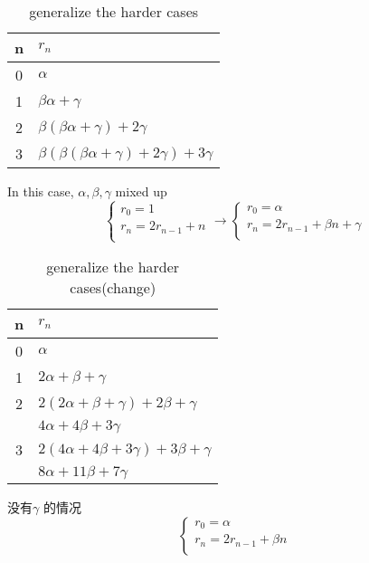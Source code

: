 \begin{table}[htbp]
	\centering
	\small
	\caption{generalize the harder cases}
	\begin{tabular}{cl}
		\toprule
		n & $ r_n $ \\
		\midrule
        0 & $ \alpha $  \\
        1 & $ \beta\alpha+\gamma $  \\
        2 & $ \beta(\beta\alpha+\gamma)+2\gamma $  \\
        3 & $ \beta(\beta(\beta\alpha+\gamma)+2\gamma)+3\gamma $  \\
		\bottomrule
	\end{tabular}%
	\label{tab:casesofharderChange003}%
\end{table}%
In this case, $ \alpha, \beta, \gamma $ mixed up
\begin{equation*}
    \left\{
        \begin{array}{l}
            r_0 = 1\\
            r_n = 2r_{n-1}+n \\
        \end{array}
    \right. \rightarrow
    \left\{
        \begin{array}{l}
            r_0 = \alpha \\
            r_n = 2 r_{n-1} + \beta n + \gamma \\
        \end{array}
    \right.
\end{equation*}
\begin{table}[htbp]
	\centering
	\small
	\caption{generalize the harder cases(change)}
	\begin{tabular}{cl}
		\toprule
		n & $ r_n $ \\
		\midrule
        0 & $ \alpha $  \\
        1 & $ 2\alpha+\beta+\gamma $  \\
        2 & $ 2(2\alpha+\beta+\gamma)+2\beta+\gamma $  \\
          & $ 4\alpha + 4\beta + 3\gamma $ \\
        3 & $ 2(4\alpha + 4\beta + 3\gamma)+3\beta+\gamma $  \\
          & $ 8\alpha + 11\beta + 7\gamma $ \\
		\bottomrule
	\end{tabular}%
	\label{tab:casesofharderChange}%
\end{table}%
没有$ \gamma $ 的情况
\begin{equation*}
    \left\{
        \begin{array}{l}
            r_0 = \alpha\\
            r_n = 2r_{n-1}+\beta n \\
        \end{array}
    \right.
\end{equation*}
